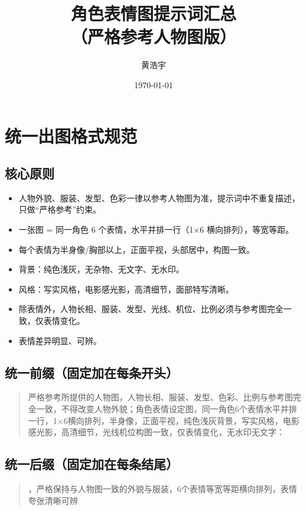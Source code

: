 \documentclass[11pt, a4paper]{article}
\title{角色表情图提示词汇总\\（严格参考人物图版）}
\author{黄浩宇}
\date{\today}
\begin{document}
	
	\maketitle
	\newpage
	
	\tableofcontents
	\newpage
	
	\section{统一出图格式规范}
	
	\subsection*{核心原则}
	\begin{itemize}[leftmargin=2em, itemsep=0.2em]
		\item 人物外貌、服装、发型、色彩一律以参考人物图为准，提示词中不重复描述，只做“严格参考”约束。
		\item 一张图 = 同一角色 6 个表情，水平并排一行（1×6 横向排列），等宽等距。
		\item 每个表情为半身像/胸部以上，正面平视，头部居中，构图一致。
		\item 背景：纯色浅灰，无杂物、无文字、无水印。
		\item 风格：写实风格，电影感光影，高清细节，面部特写清晰。
		\item 除表情外，人物长相、服装、发型、光线、机位、比例必须与参考图完全一致，仅表情变化。
		\item 表情差异明显、可辨。
	\end{itemize}
	
	\subsection*{统一前缀（固定加在每条开头）}
	\begin{quote}
		\small
		严格参考所提供的人物图，人物长相、服装、发型、色彩、比例与参考图完全一致，不得改变人物外貌；角色表情设定图，同一角色6个表情水平并排一行，1×6横向排列，半身像，正面平视，纯色浅灰背景，写实风格，电影感光影，高清细节，光线机位构图一致，仅表情变化，无水印无文字：
	\end{quote}
	
	\subsection*{统一后缀（固定加在每条结尾）}
	\begin{quote}
		\small
		，严格保持与人物图一致的外貌与服装，6个表情等宽等距横向排列，表情夸张清晰可辨
	\end{quote}
	
\end{document}
